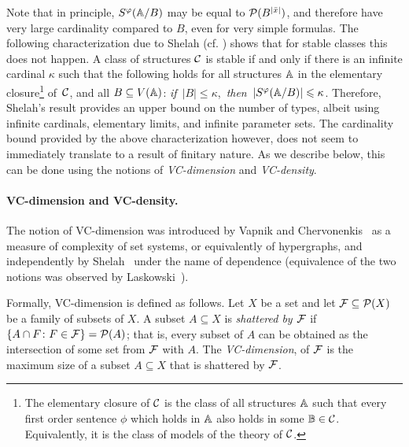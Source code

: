 Note that in principle, $S^\phi(\str A/B)$
may be equal to $\Pow(B^{|\bar x|})$, and therefore have very large cardinality compared to $B$, even for very simple formulas. 
The following characterization due to Shelah 
(cf. \cite[Theorem 2.2, Chapter II]{shelah1990classification})
shows that for stable classes this does not happen.
A class of structures $\cal C$
	is stable if and only if 
	there is 
	an infinite cardinal $\kappa$
	such that the following holds for all
	structures
	$\str A$ in the elementary closure\footnote{The elementary closure of $\cal C$ is 
	the class of all structures $\str A$
	such that  every first order sentence $\phi$
	which holds in $\str A$ also holds in some $\str B\in \cal C$. Equivalently, it is the class of 
   models of the theory of $\cal C$.} of~$\cal C$, and 
   all $B\subset V(\str A)$:
\mbox{\textit{if} $|B|\le \kappa$, \textit{then} $
|S^\phi(\str A/B)|\le \kappa$.}
Therefore,
Shelah's result provides an upper bound on the number of types, albeit using infinite cardinals, elementary limits, and infinite parameter sets.
 The cardinality bound provided by the above characterization %
 however, does not seem to  immediately translate to a result of finitary nature. As we describe below,
 this can be done using the notions of {\em{VC-dimension}} and {\em{VC-density}}.

\paragraph{VC-dimension and VC-density.} The notion of VC-di\-men\-sion was introduced by 
Vapnik and Chervonenkis~\cite{chervonenkis1971theory} 
as a measure of complexity of set systems, or equivalently of 
hypergraphs, and independently by Shelah~\cite{shelah1971stability} 
under the name of dependence (equivalence of the two notions
was observed by Laskowski~\cite{laskowski1992vapnik}).

Formally, VC-dimension is defined as follows. 
Let $X$ be a set and let  $\FFF\subseteq \Pow(X)$ 
be a family of subsets of $X$.
A subset $A\subseteq X$ is \emph{shattered by $\FFF$} if
$\{A\cap F\colon F\in \FFF\}=\Pow(A)$; that is, every subset of $A$ can be obtained as the intersection of some set from $\FFF$ with $A$. 
The \emph{VC-dimension},
of $\FFF$ is the maximum size of a subset $A\subseteq X$ that is shattered by
$\FFF$.

